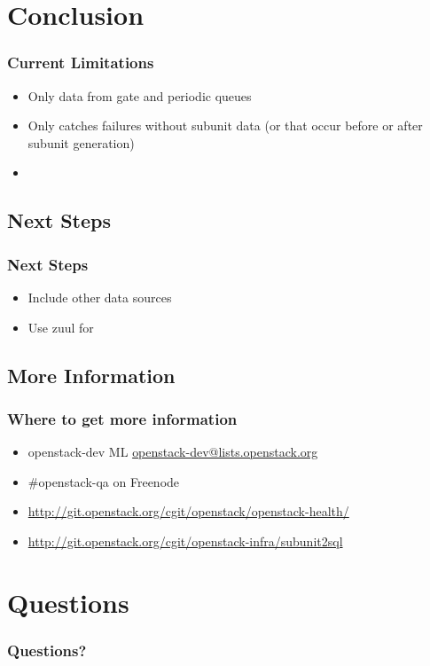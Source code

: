 \documentclass[aspectratio=169,11pt,hyperref={colorlinks=true}]{beamer}
\begin{document}
\begin{frame}

\end{frame}

\section{Conclusion}

\begin{frame}
    \frametitle{Current Limitations}
    \begin{itemize}
        \item Only data from gate and periodic queues
        \item Only catches failures without subunit data (or that occur before or after subunit generation)
        \item 
    \end{itemize}
\end{frame}

\subsection{Next Steps}
\begin{frame}
    \frametitle{Next Steps}
    \begin{itemize}
        \item Include other data sources
        \item Use zuul for
    \end{itemize}
\end{frame}

\subsection{More Information}
\begin{frame}
\frametitle{Where to get more information}
    \begin{itemize}
        \item openstack-dev ML\: \href{mailto:openstack-dev@lists.openstack.org}{openstack-dev@lists.openstack.org}
        \item \#openstack-qa on Freenode
        \item \href{http://git.openstack.org/cgit/openstack/openstack-health/}{http://git.openstack.org/cgit/openstack/openstack-health/}
        \item \href{http://git.openstack.org/cgit/openstack-infra/subunit2sql}{http://git.openstack.org/cgit/openstack-infra/subunit2sql}

    \end{itemize}
\end{frame}

\section{Questions}
\begin{frame}
\frametitle{Questions?}
\end{frame}
\end{document}
